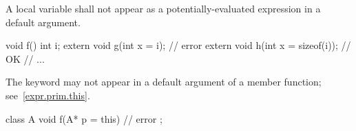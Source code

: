 \pnum
A local variable shall not appear as a potentially-evaluated expression
in a default argument.
\begin{example}

\begin{codeblock}
void f() {
  int i;
  extern void g(int x = i);          // error
  extern void h(int x = sizeof(i));  // OK
  // ...
}
\end{codeblock}
\end{example}

\pnum
\begin{note}
The keyword
may not appear in a default argument of a member function;
see~\ref{expr.prim.this}.
\begin{example}

\begin{codeblock}
class A {
  void f(A* p = this) { }       // error
};
\end{codeblock}
\end{example}
\end{note}

